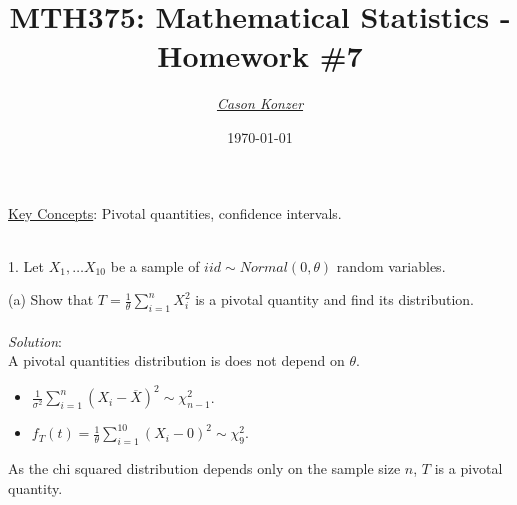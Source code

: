 \documentclass[12pt]{article}
\newcommand{\XB}{\color{black}}
\newcommand{\XBB}{\color{blue}}
\newcommand{\XV}{\color{violet}}
\newcommand{\ds}{\displaystyle}
\begin{document}
\title{\textbf{MTH375}: Mathematical Statistics - Homework \#7}
\date{\today}
\author{\XV\textit{\large{\href{https://github.com/casonk}{Cason Konzer}}}\XB}

\maketitle
\hrulefill
\vfill
    \underline{Key Concepts}: Pivotal quantities, confidence intervals.

\newpage
\newpage
\XBB\hrulefill\XB \\

1. Let $ X_{1}, \dots X_{10} $ be a sample of $ iid \sim Normal(0,\theta) $ random variables. \\

\XBB\hrulefill\XB
\vspace{5mm}

(a) Show that $ \ds T = \frac{1}{\theta} \sum_{i=1}^{n} X_{i}^{2} $ is a pivotal quantity and find its distribution. \\
\vspace{2.5mm} \\
\textit{Solution}:
\vspace{2.5mm} \\

\noindent
A pivotal quantities distribution is does not depend on $ \theta $. \\

\begin{itemize}
    \item $ \ds \frac{1}{\sigma^{2}} \sum_{i=1}^{n} (X_{i} - \overline{X})^{2} \sim \chi_{n-1}^{2}  $. \\
    \item $ \ds f_{T}(t) = \frac{1}{\theta} \sum_{i=1}^{10} (X_{i} - 0)^{2} \sim \chi_{9}^{2}  $. \\
\end{itemize}

\noindent
As the chi squared distribution depends only on the sample size $ n $, $ T $ is a pivotal quantity. \\

\vspace{2.5mm}
\end{document}
